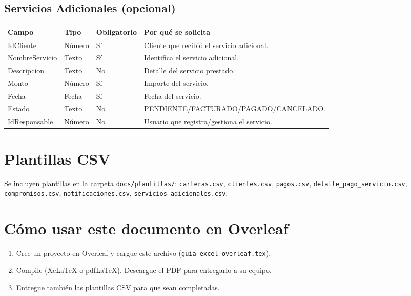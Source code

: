 \documentclass[11pt,a4paper]{article}
\begin{document}
\subsection{Servicios Adicionales (opcional)}
\begin{longtable}{|p{3.2cm}|p{2.2cm}|p{2.2cm}|p{6.0cm}|}
\hline
\textbf{Campo} & \textbf{Tipo} & \textbf{Obligatorio} & \textbf{Por qué se solicita} \\
\hline
IdCliente & Número & Sí & Cliente que recibió el servicio adicional. \\
NombreServicio & Texto & Sí & Identifica el servicio adicional. \\
Descripcion & Texto & No & Detalle del servicio prestado. \\
Monto & Número & Sí & Importe del servicio. \\
Fecha & Fecha & Sí & Fecha del servicio. \\
Estado & Texto & No & PENDIENTE/FACTURADO/PAGADO/CANCELADO. \\
IdResponsable & Número & No & Usuario que registra/gestiona el servicio. \\
\hline
\end{longtable}

\section*{Plantillas CSV}
Se incluyen plantillas en la carpeta \texttt{docs/plantillas/}: \texttt{carteras.csv}, \texttt{clientes.csv}, \texttt{pagos.csv}, \texttt{detalle\_pago\_servicio.csv}, \texttt{compromisos.csv}, \texttt{notificaciones.csv}, \texttt{servicios\_adicionales.csv}.

\section*{Cómo usar este documento en Overleaf}
\begin{enumerate}
  \item Cree un proyecto en Overleaf y cargue este archivo (\texttt{guia-excel-overleaf.tex}).
  \item Compile (XeLaTeX o pdfLaTeX). Descargue el PDF para entregarlo a su equipo.
  \item Entregue también las plantillas CSV para que sean completadas.
\end{enumerate}
\end{document}
